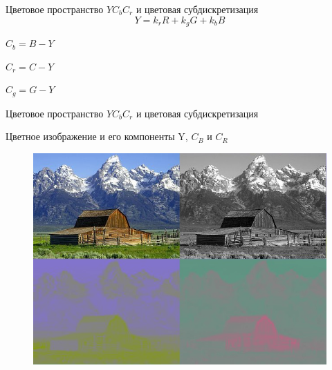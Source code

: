 \documentclass[11pt]{beamer}
\begin{document}
\begin{frame}{Цветовое пространство $YC_bC_r$ и цветовая субдискретизация}
	\begin{displaymath}
		Y = k_rR + k_gG + k_bB
	\end{displaymath}

	\begin{center}
		$C_b = B - Y$

		$C_r = C - Y$

		$C_g = G - Y$
	\end{center}
\end{frame}




\begin{frame}{Цветовое пространство $YC_bC_r$ и цветовая субдискретизация}
\begin{block}{Цветное изображение и его компоненты Y, $C_B$ и $C_R$}
\begin{figure}[H]
	\begin{center}
		\includegraphics[scale=0.77]{../pics/YCbCr/YCbCr_separation_vert.jpg}
	\end{center}
\end{figure}
\end{block}
\end{frame}
\end{document}
